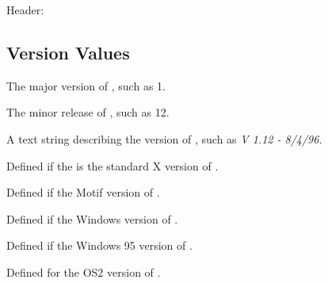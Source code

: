 \begin{description}
	\item [Header:] 
\end{description}

\subsection* {Version Values}

 The major version of \V, such as 1.

 The minor release of \V, such as 12.

 A text string describing the version of
\V, such as \emph{V 1.12 - 8/4/96}.

 Defined if the is the standard X version of \V.

 Defined if the Motif version of \V.

 Defined if the Windows version of \V.

 Defined if the Windows 95 version of \V.

 Defined for the OS2 version of \V.
